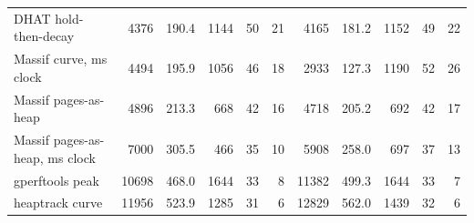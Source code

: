 \begin{tabular}{lrrrrrrrrrr}
DHAT hold-then-decay & 4376 & 190.4 & 1144 & 50 & 21 & 4165 & 181.2 & 1152 & 49 & 22 \\
Massif curve, ms clock & 4494 & 195.9 & 1056 & 46 & 18 & 2933 & 127.3 & 1190 & 52 & 26 \\
Massif pages-as-heap & 4896 & 213.3 & 668 & 42 & 16 & 4718 & 205.2 & 692 & 42 & 17 \\
Massif pages-as-heap, ms clock & 7000 & 305.5 & 466 & 35 & 10 & 5908 & 258.0 & 697 & 37 & 13 \\
gperftools peak & 10698 & 468.0 & 1644 & 33 & 8 & 11382 & 499.3 & 1644 & 33 & 7 \\
heaptrack curve & 11956 & 523.9 & 1285 & 31 & 6 & 12829 & 562.0 & 1439 & 32 & 6 \\
\bottomrule
\end{tabular}
